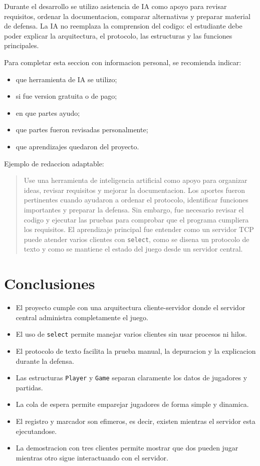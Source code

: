 \documentclass[12pt,a4paper]{article}
\begin{document}
Durante el desarrollo se utilizo asistencia de IA como apoyo para revisar
requisitos, ordenar la documentacion, comparar alternativas y preparar material
de defensa. La IA no reemplaza la comprension del codigo: el estudiante debe
poder explicar la arquitectura, el protocolo, las estructuras y las funciones
principales.

Para completar esta seccion con informacion personal, se recomienda indicar:

\begin{itemize}
    \item que herramienta de IA se utilizo;
    \item si fue version gratuita o de pago;
    \item en que partes ayudo;
    \item que partes fueron revisadas personalmente;
    \item que aprendizajes quedaron del proyecto.
\end{itemize}

Ejemplo de redaccion adaptable:

\begin{quote}
Use una herramienta de inteligencia artificial como apoyo para organizar ideas,
revisar requisitos y mejorar la documentacion. Los aportes fueron pertinentes
cuando ayudaron a ordenar el protocolo, identificar funciones importantes y
preparar la defensa. Sin embargo, fue necesario revisar el codigo y ejecutar las
pruebas para comprobar que el programa cumpliera los requisitos. El aprendizaje
principal fue entender como un servidor TCP puede atender varios clientes con
\texttt{select}, como se disena un protocolo de texto y como se mantiene el
estado del juego desde un servidor central.
\end{quote}

\section{Conclusiones}

\begin{itemize}
    \item El proyecto cumple con una arquitectura cliente-servidor donde el
    servidor central administra completamente el juego.
    \item El uso de \texttt{select} permite manejar varios clientes sin usar
    procesos ni hilos.
    \item El protocolo de texto facilita la prueba manual, la depuracion y la
    explicacion durante la defensa.
    \item Las estructuras \texttt{Player} y \texttt{Game} separan claramente los
    datos de jugadores y partidas.
    \item La cola de espera permite emparejar jugadores de forma simple y
    dinamica.
    \item El registro y marcador son efimeros, es decir, existen mientras el
    servidor esta ejecutandose.
    \item La demostracion con tres clientes permite mostrar que dos pueden jugar
    mientras otro sigue interactuando con el servidor.
\end{itemize}
\end{document}
